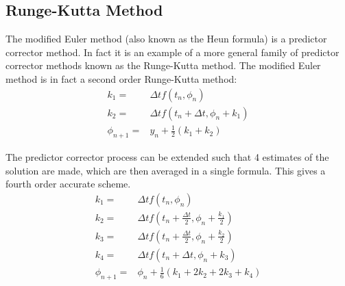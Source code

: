 \documentclass[../Interim_Report_Master]{subfiles}
\begin{document}
\subsection{Runge-Kutta Method}
The modified Euler method (also known as the Heun formula) is a predictor corrector method. In fact it is an example of a more general family of predictor corrector methods known as the Runge-Kutta method. The modified Euler method is in fact a second order Runge-Kutta method:
\begin{subequations}
\begin{eqnarray}
k_1 =& \Delta t f(t_n,\phi_n) \\
k_2 =& \Delta t f\left(t_n+\Delta t, \phi_n+k_1\right) \\
\phi_{n+1} =& y_n + \frac{1}{2}(k_1+k_2)
\end{eqnarray}
\end{subequations}	

The predictor corrector process can be extended such that 4 estimates of the solution are made, which are then averaged in a single formula. This gives a fourth order accurate scheme.
\begin{subequations}
\begin{eqnarray}
k_1 =& \Delta t f(t_n,\phi_n) \\
k_2 =& \Delta t f\left(t_n+\frac{\Delta t}{2}, \phi_n+\frac{k_1}{2}\right) \\
k_3 =& \Delta t f\left(t_n+\frac{\Delta t}{2}, \phi_n+\frac{k_2}{2}\right) \\
k_4 =& \Delta t f\left(t_n+\Delta t, \phi_n+k_3\right) \\
\phi_{n+1} =& \phi_n + \frac{1}{6}(k_1+2k_2+2k_3+k_4)
\end{eqnarray}
\end{subequations} 
\end{document}
